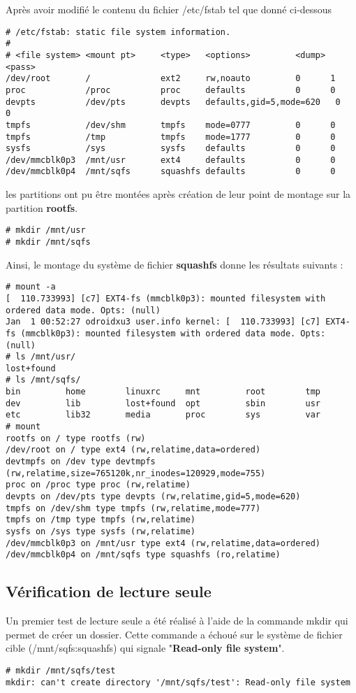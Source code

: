 Après avoir modifié le contenu du fichier /etc/fstab tel que donné ci-dessous
\begin{lstlisting}
# /etc/fstab: static file system information.
#
# <file system> <mount pt>     <type>   <options>         <dump> <pass>
/dev/root       /              ext2     rw,noauto         0      1
proc            /proc          proc     defaults          0      0
devpts          /dev/pts       devpts   defaults,gid=5,mode=620   0      0
tmpfs           /dev/shm       tmpfs    mode=0777         0      0
tmpfs           /tmp           tmpfs    mode=1777         0      0
sysfs           /sys           sysfs    defaults          0      0
/dev/mmcblk0p3  /mnt/usr       ext4     defaults          0      0
/dev/mmcblk0p4  /mnt/sqfs      squashfs defaults          0      0
\end{lstlisting}

les partitions ont pu être montées après création de leur point de montage sur la partition \textbf{rootfs}.
\begin{lstlisting}
# mkdir /mnt/usr
# mkdir /mnt/sqfs
\end{lstlisting}

Ainsi, le montage du système de fichier \textbf{squashfs} donne les résultats suivants :
\begin{lstlisting}
# mount -a
[  110.733993] [c7] EXT4-fs (mmcblk0p3): mounted filesystem with ordered data mode. Opts: (null)
Jan  1 00:52:27 odroidxu3 user.info kernel: [  110.733993] [c7] EXT4-fs (mmcblk0p3): mounted filesystem with ordered data mode. Opts: (null)
# ls /mnt/usr/
lost+found
# ls /mnt/sqfs/
bin         home        linuxrc     mnt         root        tmp
dev         lib         lost+found  opt         sbin        usr
etc         lib32       media       proc        sys         var
# mount
rootfs on / type rootfs (rw)
/dev/root on / type ext4 (rw,relatime,data=ordered)
devtmpfs on /dev type devtmpfs (rw,relatime,size=765120k,nr_inodes=120929,mode=755)
proc on /proc type proc (rw,relatime)
devpts on /dev/pts type devpts (rw,relatime,gid=5,mode=620)
tmpfs on /dev/shm type tmpfs (rw,relatime,mode=777)
tmpfs on /tmp type tmpfs (rw,relatime)
sysfs on /sys type sysfs (rw,relatime)
/dev/mmcblk0p3 on /mnt/usr type ext4 (rw,relatime,data=ordered)
/dev/mmcblk0p4 on /mnt/sqfs type squashfs (ro,relatime)
\end{lstlisting}

\subsection{Vérification de lecture seule}
Un premier test de lecture seule a été réalisé à l'aide de la commande mkdir qui permet de créer un dossier. Cette commande a échoué sur le système de fichier cible (/mnt/sqfs:squashfs) qui signale "\textbf{Read-only file system}".
\begin{lstlisting}
# mkdir /mnt/sqfs/test
mkdir: can't create directory '/mnt/sqfs/test': Read-only file system
\end{lstlisting}

